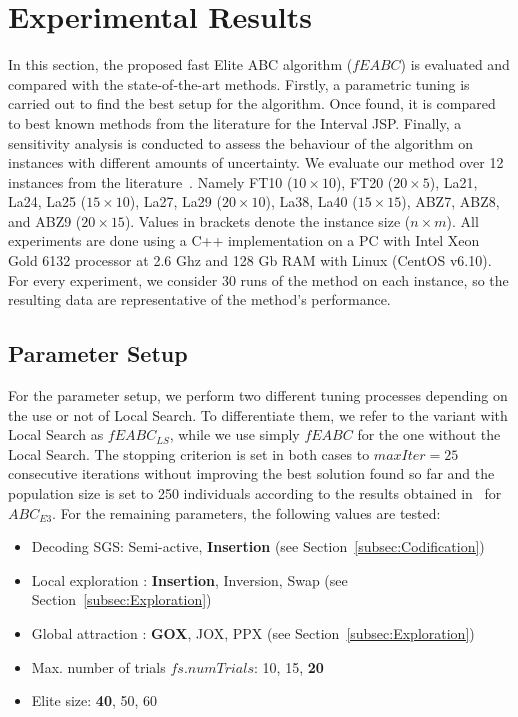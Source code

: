 \documentclass[sn-mathphys]{sn-jnl}%
\theoremstyle{thmstyleone}%
\theoremstyle{thmstyletwo}%
\theoremstyle{thmstylethree}%
\begin{document}
\section{Experimental Results}\label{secResults}
In this section, the proposed fast Elite ABC algorithm ($fEABC$) is evaluated and compared with the state-of-the-art methods. Firstly, a parametric tuning is carried out to find the best setup for the algorithm. Once found, it is compared to best known methods from the literature for the Interval JSP. Finally, a sensitivity analysis is conducted to assess the behaviour of the algorithm on instances with different amounts of uncertainty. We evaluate our method over 12 instances from the literature~\cite{Diaz2020genetic}. Namely FT10 ($10\times10$), FT20 ($20\times5$), La21, La24, La25 ($15\times10$), La27, La29 ($20\times10$), La38, La40 ($15\times15$), ABZ7, ABZ8, and ABZ9 ($20\times15$). Values in brackets denote the instance size ($n \times m$). All experiments are done using a C++ implementation on a PC with Intel Xeon Gold 6132 processor at 2.6 Ghz and 128 Gb RAM with Linux (CentOS v6.10). For every experiment, we consider 30 runs of the method on each instance, so the resulting data are representative of the method's performance.

\subsection{Parameter Setup}
For the parameter setup, we perform two different tuning processes depending on the use or not of Local Search. To differentiate them, we refer to the variant with Local Search as $fEABC_{LS}$, while we use simply $fEABC$ for the one without the Local Search. The stopping criterion is set in both cases to $\mathit{maxIter}=25$ consecutive iterations without improving the best solution found so far and the population size is set to 250 individuals according to the results obtained in~\cite{Diaz2022} for $ABC_{E3}$. For the remaining parameters, the following values are tested:
\begin{itemize}
\item Decoding SGS: Semi-active, \textbf{Insertion} (see Section~\ref{subsec:Codification})
\item Local exploration : \textbf{Insertion}, Inversion, Swap (see Section~\ref{subsec:Exploration})
\item Global attraction : \textbf{GOX}, JOX, PPX (see Section~\ref{subsec:Exploration})
\item Max. number of trials $fs.numTrials$: 10, 15, \textbf{20}
\item Elite size: \textbf{40}, 50, 60
\end{itemize}
\end{document}
